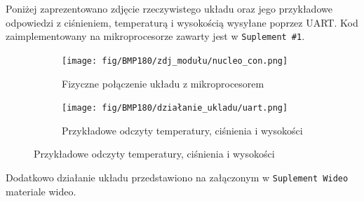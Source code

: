 \documentclass[11pt, a4paper]{article}
\begin{document}
Poniżej zaprezentowano zdjęcie rzeczywistego układu oraz jego przykładowe odpowiedzi z ciśnieniem, temperaturą i wysokością wysyłane poprzez UART. Kod zaimplementowany na mikroprocesorze zawarty jest w \texttt{Suplement \#1}.

\vspace{0.25cm}
\begin{figure}[h]
\centering
\begin{subfigure}{.5\textwidth}
\centering
\texttt{[image: fig/BMP180/zdj\_modułu/nucleo\_con.png]}
\caption{Fizyczne połączenie układu z mikroprocesorem}
\label{fig:_nucleo_con}
\end{subfigure}%
\begin{subfigure}{.5\textwidth}
\centering
\texttt{[image: fig/BMP180/działanie\_ukladu/uart.png]}
\caption{Przykładowe odczyty temperatury, ciśnienia i wysokości}
\label{fig:_altitude}
\end{subfigure}
\label{fig:element}
\end{figure}
\vspace{0.25cm}
Dodatkowo działanie układu przedstawiono na załączonym w \texttt{Suplement Wideo} materiale 
wideo.

\newpage
\printbibliography[heading=bibintoc]
\end{document}
